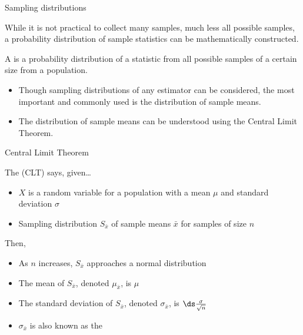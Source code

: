 \documentclass[xcolor=table, aspectratio=169, bigger]{beamer}
\begin{document}
\begin{frame}{Sampling distributions}
\begin{block}{}
While it is not practical to collect many samples, much less all possible samples, a probability distribution of sample statistics can be mathematically constructed.
\end{block}

\pause
\begin{block}{}
A  is a probability distribution of a statistic from all possible samples of a certain size from a population.

\begin{itemize}
\pause\item Though sampling distributions of any estimator can be considered, the most important and commonly used is the distribution of sample means.
\pause\item The distribution of sample means can be understood using the Central Limit Theorem.
\end{itemize}
\end{block}

\end{frame}


\begin{frame}{Central Limit Theorem}
\begin{block}{}
The  (CLT) says, given\ldots
\begin{itemize}
\pause\item $X$ is a random variable for a population with a mean $\mu$ and standard deviation $\sigma$
\pause\item Sampling distribution $S_{\bar x}$ of sample means $\bar x$ for samples of size $n$
\end{itemize}
\bigskip
\pause Then,
\begin{itemize}
\item As $n$ increases, $S_{\bar x}$ approaches a normal distribution
\pause\item The mean of $S_{\bar x}$, denoted $\mu_{\bar x}$, is $\mu$
\pause\item The standard deviation of $S_{\bar x}$, denoted $\sigma_{\bar x}$, is $\ds \frac \sigma {\sqrt n}$  
\pause\item $\sigma_{\bar x}$ is also known as the 
\end{itemize}
\end{block}
\end{frame}
\end{document}
